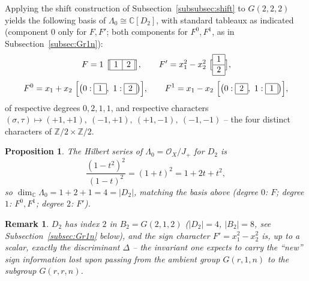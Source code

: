 \documentclass[11pt,a4paper]{article}
\newtheorem{proposition}[theorem]{Proposition}
\newtheorem{remark}[theorem]{Remark}
\begin{document}
Applying the shift construction of Subsection~\ref{subsubsec:shift} to $G(2,2,2)$
yields the following basis of $\Lambda_0 \cong \mathbb{C}[D_2]$, with
standard tableaux as indicated (component $0$ only for $F,F'$; both
components for $F^0,F^1$, as in Subsection~\ref{subsec:Gr1n}):
\[
 F = 1 \ \big[\begin{array}{|c|c|}\hline 1&2\\\hline\end{array}\big],
 \qquad
 F' = x_1^2-x_2^2 \ \big[\begin{array}{|c|}\hline 1\\\hline 2\\\hline\end{array}\big],
\]
\[
 F^0 = x_1+x_2 \ \Big[\big(0:\begin{array}{|c|}\hline 1\\\hline\end{array},\
   1:\begin{array}{|c|}\hline 2\\\hline\end{array}\big)\Big],
 \qquad
 F^1 = x_1-x_2 \ \Big[\big(0:\begin{array}{|c|}\hline 2\\\hline\end{array},\
   1:\begin{array}{|c|}\hline 1\\\hline\end{array}\big)\Big],
\]
of respective degrees $0,2,1,1$, and respective characters
$(\sigma,\tau) \mapsto (+1,+1),\ (-1,+1),\ (+1,-1),\ (-1,-1)$ -- the
four distinct characters of $\mathbb{Z}/2\times\mathbb{Z}/2$.

\begin{proposition}
The Hilbert series of $\Lambda_0 = \mathcal{O}_X/J_+$ for $D_2$ is
\[
 \frac{(1-t^2)^2}{(1-t)^2} = (1+t)^2 = 1+2t+t^2,
\]
so $\dim_{\mathbb{C}} \Lambda_0 = 1+2+1 = 4 = |D_2|$, matching the
basis above (degree $0$: $F$; degree $1$: $F^0,F^1$; degree $2$: $F'$).
\end{proposition}

\begin{remark}
$D_2$ has index $2$ in $B_2 = G(2,1,2)$ ($|D_2|=4$, $|B_2|=8$, see
Subsection~\ref{subsec:Gr1n} below), and the sign character
$F'=x_1^2-x_2^2$ is, up to a scalar, exactly the discriminant
$\Delta$ -- the invariant one expects to carry the ``new'' sign
information lost upon passing from the ambient group $G(r,1,n)$ to
the subgroup $G(r,r,n)$.
\end{remark}
\end{document}

